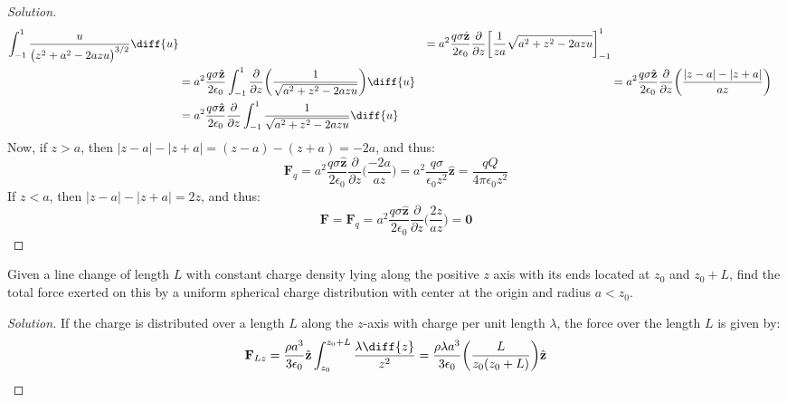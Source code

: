\documentclass[crop=false,class=article,oneside]{standalone}
\begin{document}
\begin{proof}[Solution]
\begin{align*}
            \int_{-1}^{1}\frac{u}{\big(z^{2}+a^{2}-2azu\big)^{3/2}}\diff{u}
            &
            &=a^{2}\frac{q\sigma \hat{\mathbf{z}}}{2\epsilon_{0}}
            \frac{\partial}{\partial z}
            \bigg[\frac{1}{za}\sqrt{a^{2}+z^{2}-2azu}\bigg]_{-1}^{1}\\
            &=a^{2}\frac{q\sigma\hat{\mathbf{z}}}{2\epsilon_{0}}
            \int_{-1}^{1}\frac{\partial}{\partial{z}}
            \bigg(\frac{1}{\sqrt{a^{2}+z^{2}-2azu}}\bigg)\diff{u}
            &
            &=a^{2}\frac{q\sigma\hat{\mathbf{z}}}{2\epsilon_{0}}
            \frac{\partial}{\partial{z}}
            \bigg(\frac{|z-a|-|z+a|}{az}\bigg)\\
            &=a^{2}\frac{q\sigma \hat{\mathbf{z}}}{2\epsilon_{0}}
            \frac{\partial}{\partial{z}}
            \int_{-1}^{1}\frac{1}{\sqrt{a^{2}+z^{2}-2azu}}\diff{u}\\
        \end{align*}
        Now, if $z>a$, then $|z-a|-|z+a|=(z-a)-(z+a)=-2a$, and thus:
        \begin{equation*}
            \mathbf{F}_{q}
            =a^{2}\frac{q\sigma\hat{\mathbf{z}}}{2\epsilon_{0}}
            \frac{\partial}{\partial{z}}\bigg(\frac{-2a}{az}\bigg)
            =a^{2}\frac{q\sigma}{\epsilon_{0}z^{2}}\hat{\mathbf{z}}
            =\frac{qQ}{4\pi\epsilon_{0}z^{2}}\tag{$z>a$}
        \end{equation*}
        If $z<a$, then $|z-a|-|z+a|=2z$, and thus:
        \begin{equation*}
            \mathbf{F}=\mathbf{F}_{q}=a^{2}\frac{q\sigma
            \hat{\mathbf{z}}}{2\epsilon_{0}}
            \frac{\partial}{\partial z}\bigg(\frac{2z}{az}\bigg)
            =\mathbf{0}\tag{$z<a$}
        \end{equation*}
    \end{proof}
    \begin{problem}[Wangsness 2-7]
        Given a line change of length $L$ with constant charge
        density lying along the positive $z$ axis with its
        ends located at $z_{0}$ and $z_{0}+L$, find the total
        force exerted on this by a uniform spherical charge
        distribution with center at the origin
        and radius $a<z_{0}$.
    \end{problem}
    \begin{proof}[Solution]
        If the charge is distributed over a length $L$
        along the $z$-axis with charge per unit length $\lambda$,
        the force over the length $L$ is given by:
        \begin{equation*}
            \mathbf{F}_{Lz}
            =\frac{\rho a^{3}}{3\epsilon_{0}}\hat{\mathbf{z}}
            \int_{z_{0}}^{z_{0}+L}\frac{\lambda\diff{z}}{z^{2}}
            =\frac{\rho\lambda{a^{3}}}{3\epsilon_{0}}
            \bigg(\frac{L}{z_{0}(z_{0}+L)}\bigg)
            \hat{\mathbf{z}}
        \end{equation*}
    \end{proof}
\end{document}
